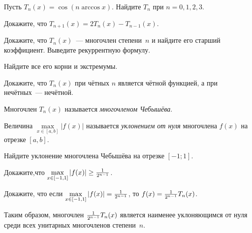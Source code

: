 \documentclass[14pt,DIV14]{scrartcl}
\begin{document}

\begin{definition}
\end{definition}

\begin{task}
Пусть $T_n(x)=\cos(n\arccos x)$.  
\sub Найдите $T_n$ при $n=0,1,2,3$.

\sub Докажите, что $T_{n+1}(x) = 2T_n(x)-T_{n-1}(x)$.

\sub Докажите, что $T_n(x)$~--- многочлен степени~$n$ и найдите его старший коэффициент. Выведите рекуррентную формулу.

\sub Найдите все его корни и экстремумы.
\end{task}

\begin{task}
Докажите, что $T_n(x)$ при чётных $n$ является чётной функцией, а при нечётных~--- нечётной.
\end{task}

\begin{definition}
Многочлен $T_n(x)$ называется \emph{многочленом Чебышёва}.
\end{definition}

\begin{definition}
Величина $\max\limits_{x\in[a,b]}|f(x)|$ называется {\it уклонением от нуля} многочлена $f(x)$ 
на отрезке $[a,b]$.
\end{definition}

\begin{task}\sub Найдите уклонение многочлена Чебышёва на отрезке $[-1;1]$.

\sub Докажите,что  $\max\limits_{x\in[-1,1]}|f(x)|\ge{1\over 2^{n-1}}$.

\sub Докажите, что если $\max\limits_{x\in[-1,1]}|f(x)|={1\over 2^{n-1}}$,
то $f(x)={1\over2^{n-1}}T_n(x)$.
\end{task}

\begin{remark}
Таким образом, многочлен ${1\over2^{n-1}}T_n(x)$ является наименее уклоняющимся от нуля среди всех
унитарных многочленов степени~$n$.
\end{remark}
\end{document}
